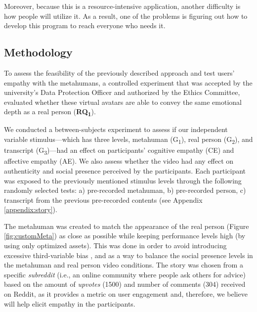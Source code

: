 Moreover, because this is a resource-intensive application, another difficulty is how people will utilize it. As a result, one of the problems is figuring out how to develop this program to reach everyone who needs it. 

\subsection{Methodology}
To assess the feasibility of the previously described approach and test users' empathy with the metahumans, a controlled experiment that was accepted by the university's Data Protection Officer and authorized by the Ethics Committee, evaluated whether these virtual avatars are able to convey the same emotional depth as a real person (\textbf{RQ\textsubscript{1}}).

We conducted a between-subjects experiment to assess if our independent variable stimulus---which has three levels, metahuman (G\textsubscript{1}), real person (G\textsubscript{2}), and transcript (G\textsubscript{3})---had an effect on participants' cognitive empathy (CE) and affective empathy (AE). We also assess whether the video had any effect on authenticity and social presence perceived by the participants. Each participant was exposed to the previously mentioned stimulus levels through the following randomly selected tests: a) pre-recorded metahuman, b) pre-recorded person, c) transcript from the previous pre-recorded contents (see Appendix \ref{appendix:story}).

The metahuman was created to match the appearance of the real person (Figure \ref{fig:customMeta}) as close as possible while keeping performance levels high (by using only optimized assets). This was done in order to avoid introducing excessive third-variable bias \cite{ROT19}, and as a way to balance the social presence levels in the metahuman and real person video conditions. The story was chosen from a specific \textit{subreddit} (i.e., an online community where people ask others for advice) based on the amount of \textit{upvotes} (1500) and number of comments (304) received on Reddit, as it provides a metric on user engagement and, therefore, we believe will help elicit empathy in the participants.


